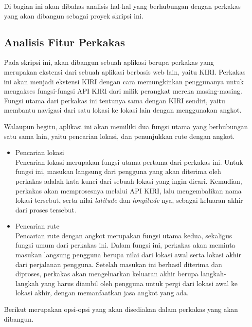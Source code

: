 Di bagian ini akan dibahas analisis hal-hal yang berhubungan dengan perkakas yang akan dibangun sebagai proyek skripsi ini.

\subsection{Analisis Fitur Perkakas}
\label{sec:analysis-thesisapp-functions}

Pada skripsi ini, akan dibangun sebuah aplikasi berupa perkakas \cl yang merupakan ekstensi dari sebuah aplikasi berbasis web lain, yaitu KIRI. Perkakas ini akan menjadi ekstensi KIRI dengan cara memungkinkan penggunanya untuk mengakses fungsi-fungsi API KIRI dari \cl milik perangkat mereka masing-masing. Fungsi utama dari perkakas ini tentunya sama dengan KIRI sendiri, yaitu membantu navigasi dari satu lokasi ke lokasi lain dengan menggunakan angkot.

Walaupun begitu, aplikasi ini akan memiliki dua fungsi utama yang berhubungan satu sama lain, yaitu pencarian lokasi, dan penunjukkan rute dengan angkot.

\begin{itemize}
	\item Pencarian lokasi\\
	Pencarian lokasi merupakan fungsi utama pertama dari perkakas ini. Untuk fungsi ini, masukan langsung dari pengguna yang akan diterima oleh perkakas adalah kata kunci dari sebuah lokasi yang ingin dicari. Kemudian, perkakas akan memprosesnya melalui API KIRI, lalu mengembalikan nama lokasi tersebut, serta nilai \textit{latitude} dan \textit{longitude}-nya, sebagai keluaran akhir dari proses tersebut.
	\item Pencarian rute\\
	Pencarian rute dengan angkot merupakan fungsi utama kedua, sekaligus fungsi umum dari perkakas ini. Dalam fungsi ini, perkakas akan meminta masukan langsung pengguna berupa nilai \latlon dari lokasi awal serta lokasi akhir dari perjalanan pengguna. Setelah masukan ini berhasil diterima dan diproses, perkakas akan mengeluarkan keluaran akhir berupa langkah-langkah yang harus diambil oleh pengguna untuk pergi dari lokasi awal ke lokasi akhir, dengan memanfaatkan jasa angkot yang ada.
\end{itemize}
\vspace{\baselineskip}\noindent
Berikut merupakan opsi-opsi yang akan disediakan dalam perkakas yang akan dibangun.


